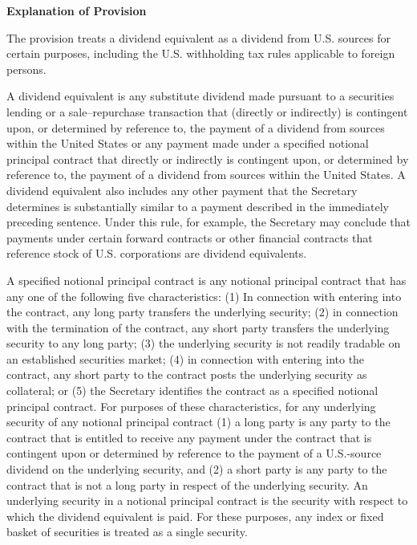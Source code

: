 \begin{select}

\begin{center}\textbf{Explanation of Provision}
\end{center}

The provision treats a dividend equivalent as a dividend from U.S. sources for certain purposes, including the U.S. withholding tax rules applicable to foreign persons.

A dividend equivalent is any substitute dividend made pursuant to a securities lending or a sale--repurchase transaction that (directly or indirectly) is contingent upon, or determined by reference to, the payment of a dividend from sources within the United States or any payment made under a specified notional principal contract that directly or indirectly is contingent upon, or determined by reference to, the payment of a dividend from sources within the United States. A dividend equivalent also includes any other payment that the Secretary determines is substantially similar to a payment described in the immediately preceding sentence. Under this rule, for example, the Secretary may conclude that payments under certain forward contracts or other financial contracts that reference stock of U.S. corporations are dividend equivalents.

A specified notional principal contract is any notional principal contract that has any one of the following five characteristics: (1) In connection with entering into the contract, any long party transfers the underlying security; (2) in connection with the termination of the contract, any short party transfers the underlying security to any long party; (3) the underlying security is not readily tradable on an established securities market; (4) in connection with entering into the contract, any short party to the contract posts the underlying security as collateral; or (5) the Secretary identifies the contract as a specified notional principal contract. For purposes of these characteristics, for any underlying security of any notional principal contract (1) a long party is any party to the contract that is entitled to receive any payment under the contract that is contingent upon or determined by reference to the payment of a U.S.-source dividend on the underlying security, and (2) a short party is any party to the contract that is not a long party in respect of the underlying security. An underlying security in a notional principal contract is the security with respect to which the dividend equivalent is paid. For these purposes, any index or fixed basket of securities is treated as a single security.


\end{select}

